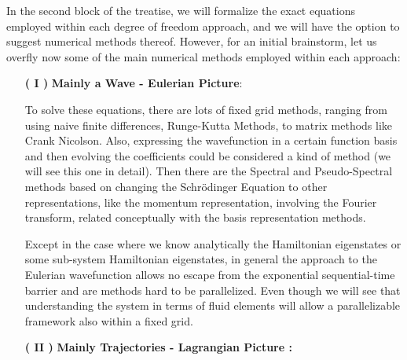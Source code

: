 \documentclass[11pt, a4paper]{article} %
\begin{document}
In the second block of the treatise, we will formalize the exact equations employed within each degree of freedom approach, and we will have the option to suggest numerical methods thereof. However, for an initial brainstorm, let us overfly now some of the main numerical methods employed within each approach:\vspace{-0.25cm}
\begin{enumerate}
\item[\bf ( I )] {\bf Mainly a Wave - Eulerian Picture}:\vspace{0.15cm}

To solve these equations, there are lots of fixed grid methods, ranging from using naive finite differences, Runge-Kutta Methods, to matrix methods like Crank Nicolson. Also, expressing the wavefunction in a certain function basis and then evolving the coefficients could be considered a kind of method (we will see this one in detail). Then there are the Spectral and Pseudo-Spectral methods based on changing the Schrödinger Equation to other representations, like the momentum representation, involving the Fourier transform, related conceptually with the basis representation methods. 

Except in the case where we know analytically the Hamiltonian eigenstates or some sub-system Hamiltonian eigenstates, in general the approach to the Eulerian wavefunction allows no escape from the exponential sequential-time barrier and are methods hard to be parallelized. Even though we will see that understanding the system in terms of fluid elements will allow a parallelizable framework also within a fixed grid.\vspace{0.2cm}

\item [\bf ( II )] {\bf Mainly Trajectories - Lagrangian Picture :}\vspace{0.15cm}


\end{enumerate}
\end{document}
